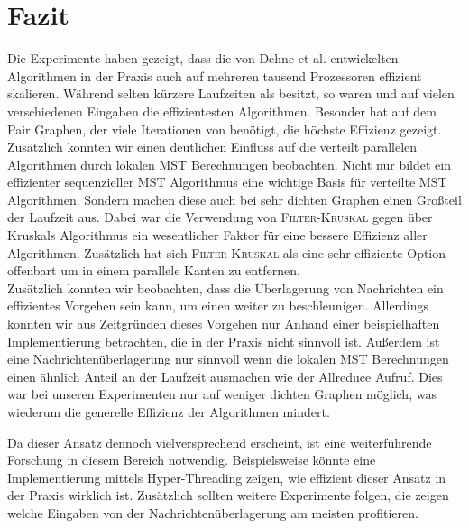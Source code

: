 \section{Fazit}\label{Fazit}

Die Experimente haben gezeigt, dass die von Dehne et al. \cite{dehne1998practical} entwickelten Algorithmen in der Praxis auch auf mehreren tausend Prozessoren effizient skalieren. Während \mergeMST selten kürzere Laufzeiten als \boruvkaAllreduce besitzt, so waren \boruvkaMixedMerge und \boruvkaThenMerge auf vielen verschiedenen Eingaben die effizientesten Algorithmen. 
Besonder \boruvkaMixedMerge hat auf dem Pair Graphen, der viele Iterationen von \boruvkaAllreduce benötigt, die höchste Effizienz gezeigt. \\
Zusätzlich konnten wir einen deutlichen Einfluss auf die verteilt parallelen Algorithmen durch lokalen MST Berechnungen beobachten. Nicht nur bildet ein effizienter sequenzieller MST Algorithmus eine wichtige Basis für verteilte MST Algorithmen. Sondern machen diese auch bei sehr dichten Graphen einen Großteil der Laufzeit aus. Dabei war die Verwendung von \textsc{Filter-Kruskal} gegen über Kruskals Algorithmus ein wesentlicher Faktor für eine bessere Effizienz aller Algorithmen. Zusätzlich hat sich \textsc{Filter-Kruskal} als eine sehr effiziente Option offenbart um in einem \boruvkaStep parallele Kanten zu entfernen.\\
Zusätzlich konnten wir beobachten, dass die Überlagerung von Nachrichten ein effizientes Vorgehen sein kann, um einen \boruvkaStep weiter zu beschleunigen.
Allerdings konnten wir aus Zeitgründen dieses Vorgehen nur Anhand einer beispielhaften Implementierung betrachten, die in der Praxis nicht sinnvoll ist.
Außerdem ist eine Nachrichtenüberlagerung nur sinnvoll wenn die lokalen MST Berechnungen einen ähnlich Anteil an der Laufzeit ausmachen wie der Allreduce Aufruf. Dies war bei unseren Experimenten nur auf weniger dichten Graphen möglich, was wiederum die generelle Effizienz der Algorithmen mindert.


Da dieser Ansatz dennoch vielversprechend erscheint, ist eine weiterführende Forschung in diesem Bereich notwendig.
Beispielsweise könnte eine Implementierung mittels Hyper-Threading zeigen, wie effizient dieser Ansatz in der Praxis wirklich ist.
Zusätzlich sollten weitere Experimente folgen, die zeigen welche Eingaben von der Nachrichtenüberlagerung am meisten profitieren.
